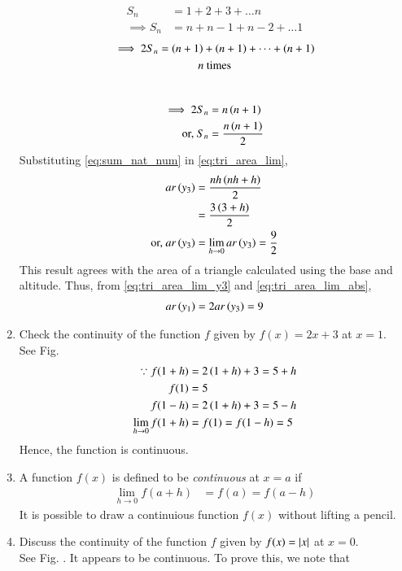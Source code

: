 \begin{enumerate}[label=\arabic*.,ref=\thesubsection.\theenumi]
%
\begin{align}
S_n&=1+2+3+\dots n
\\
\implies S_n &= n + n-1 + n-2 + \dots 1
\end{align}
\begin{multline}
\implies 2S_n = \left(n+1 \right) + \left(n+1 \right)+\dots + \left(n+1 \right)  
\\
n \text{ times}
\end{multline}
\\
\begin{align}
\implies 2S_n &= n\left(n+1\right)
\\
\text{or, } S_n &= \frac{n\left(n+1\right)}{2}
\label{eq:sum_nat_num}
\end{align}
%
Substituting \eqref{eq:sum_nat_num} in \eqref{eq:tri_area_lim},
\begin{align}
ar\left(y_3\right) &= \frac{nh\left(nh+h\right)}{2}
\\
&= \frac{3\left(3+h\right)}{2}
\\
\text{or, } ar\left(y_3\right) &= \lim_{h\to 0}ar\left(y_3\right) = \frac{9}{2}
\label{eq:tri_area_lim_y3}
\end{align}
%
This result agrees with the area of a triangle calculated using the base and altitude.
Thus, from \eqref{eq:tri_area_lim_y3} and \eqref{eq:tri_area_lim_abs},
\begin{align}
ar\left(y_1\right) = 2ar\left(y_3\right)  = 9
\end{align}
%
\item Check the continuity of the function $f$ given by $f(x) = 2x + 3$ at $x = 1$.
\\
\solution See Fig. 
\begin{align}
\because f(1+h) &= 2\left(1+h\right)+3 = 5+h
\\
f(1) &= 5
\\
f(1-h) &= 2\left(1+h\right)+3 = 5-h
\\
\lim_{h\to 0}f(1+h) &= f(1) = f(1-h) = 5
\end{align}
%
Hence, the function is continuous.
%
\item A function $f(x)$ is defined to be {\em continuous} at $x = a$ if 
\begin{align}
\label{eq:continuity}
\lim_{h\to 0}f(a+h) &= f(a) = f(a-h) 
\end{align}
It is possible to draw a continuious function $f(x)$ without lifting a pencil.  
\item Discuss the continuity of the function $f$ given by $f(x) = \left\vert x\right\vert$ at $x = 0$.
\\
\solution See Fig. .  It appears to be continuous. To prove this, we note that 

\end{enumerate}
